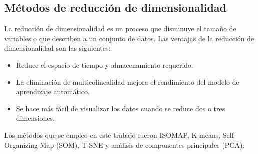 \subsection{Métodos de reducción de dimensionalidad}

La reducción de dimensionalidad es un proceso que disminuye el tamaño de variables o que describen a un conjunto de datos. Las ventajas de la reducción de dimensionalidad son las siguientes:

\begin{itemize}
    \item Reduce el espacio de tiempo y almacenamiento requerido.
    \item La eliminación de multicolinealidad mejora el rendimiento del modelo de aprendizaje automático.
    \item Se hace más fácil de visualizar los datos cuando se reduce dos o tres dimensiones.
\end{itemize}

Los métodos que se empleo en este trabajo fueron ISOMAP, K-means, Self-Organizing-Map (SOM), T-SNE y análisis de componentes principales (PCA).










